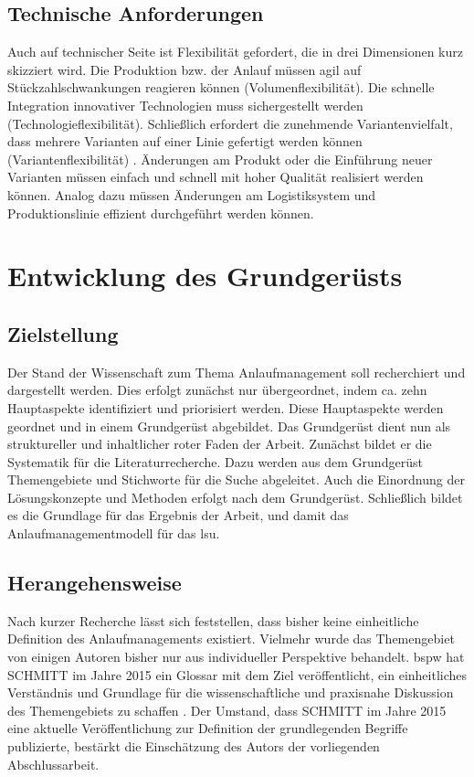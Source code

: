 \subsection*{Technische Anforderungen}

Auch auf technischer Seite ist Flexibilität gefordert, die in drei Dimensionen kurz skizziert wird. 
Die Produktion bzw. der Anlauf müssen agil auf Stückzahlschwankungen reagieren können (Volumenflexibilität). Die schnelle Integration innovativer Technologien muss sichergestellt werden (Technologieflexibilität). Schließlich erfordert die zunehmende Variantenvielfalt, dass mehrere Varianten auf einer Linie gefertigt werden können (Variantenflexibilität) \autocite[22]{Scholz2010}.
Änderungen am Produkt oder die Einführung neuer Varianten müssen einfach und schnell mit hoher Qualität realisiert werden können. Analog dazu müssen Änderungen am Logistiksystem und Produktionslinie effizient durchgeführt werden können.  

\section{Entwicklung des Grundgerüsts}\label{sec:grundgeruest}
\subsection*{Zielstellung}

Der Stand der Wissenschaft zum Thema Anlaufmanagement soll recherchiert und dargestellt werden. Dies erfolgt zunächst nur übergeordnet, indem ca. zehn Hauptaspekte identifiziert und priorisiert werden. Diese Hauptaspekte werden geordnet und in einem Grundgerüst abgebildet. Das Grundgerüst dient nun als struktureller und inhaltlicher roter Faden der Arbeit. 
Zunächst bildet er die Systematik für die Literaturrecherche. Dazu werden aus dem Grundgerüst Themengebiete und Stichworte für die Suche abgeleitet. 
Auch die Einordnung der Lösungskonzepte und Methoden erfolgt nach dem Grundgerüst. 
Schließlich bildet es die Grundlage für das Ergebnis der Arbeit, und damit das Anlaufmanagementmodell für das \gls{lsu}. 

\subsection*{Herangehensweise}\label{sec:herangehensweise_gg}

Nach kurzer Recherche lässt sich feststellen, dass bisher keine einheitliche Definition des Anlaufmanagements existiert. Vielmehr wurde das Themengebiet von einigen Autoren bisher nur aus individueller Perspektive behandelt. 
\Gls{bspw} hat SCHMITT im Jahre 2015 ein Glossar mit dem Ziel veröffentlicht, ein einheitliches Verständnis und Grundlage für die wissenschaftliche und praxisnahe Diskussion des Themengebiets zu schaffen \autocite{Schmitt2015}. 
Der Umstand, dass SCHMITT im Jahre 2015 eine aktuelle Veröffentlichung zur Definition der grundlegenden Begriffe publizierte, bestärkt die Einschätzung des Autors der vorliegenden Abschlussarbeit. 

